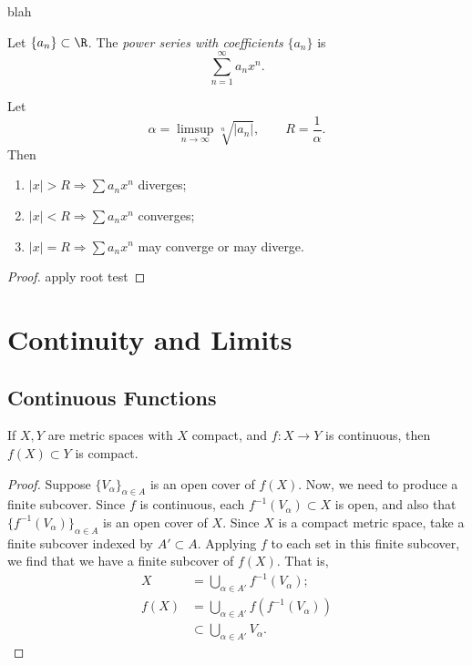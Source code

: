 \documentclass{notes}
\begin{document}
\begin{theorem}
  blah
\end{theorem}

\begin{defn}
  Let $\{a_n\} \subset \R$. The \emph{power series with coefficients} $\{a_n\}$ is $$\sum_{n=1}^\infty
  a_nx^n.$$
\end{defn}

\begin{theorem}
  Let $$\alpha = \limsup_{n\to\infty}\sqrt[n]{|a_n|}, \qquad R = \frac{1}{\alpha}.$$ Then 
  \begin{enumerate}
    \item $|x| > R \Rightarrow \sum a_nx^n$ diverges; 
    \item $|x| < R \Rightarrow \sum a_nx^n$ converges;
    \item $|x| = R \Rightarrow \sum a_nx^n$ may converge or may diverge.
  \end{enumerate} 
\end{theorem}
\begin{proof}
  apply root test
\end{proof}

\section{Continuity and Limits}
\subsection{Continuous Functions}
\begin{theorem}
  If $X,Y$ are metric spaces with $X$ compact, and $f: X \to Y$ is continuous, then $f(X) \subset Y$
  is compact.
\end{theorem}
\begin{proof}
  Suppose $\{V_\alpha\}_{\alpha\in A}$ is an open cover of $f(X)$. Now, we need to produce a finite
  subcover. Since $f$ is continuous, each $f^{-1}(V_\alpha) \subset X$ is open, and also that
  $\{f^{-1}(V_\alpha)\}_{\alpha\in A}$ is an open cover of $X$. Since $X$ is a compact metric space,
  take a finite subcover indexed by $A' \subset A$. Applying $f$ to each set in this finite
  subcover, we find that we have a finite subcover of $f(X)$. That is, 
  \begin{align*}
    X &= \bigcup_{\alpha\in A'} f^{-1}(V_\alpha); \\ 
    f(X) &= \bigcup_{\alpha\in A'} f(f^{-1}(V_\alpha)) \\ 
         &\subset \bigcup_{\alpha\in A'} V_\alpha.
  \end{align*}
\end{proof}
\end{document}
